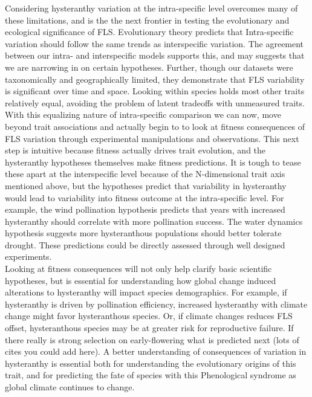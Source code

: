 \documentclass[12pt]{article}\usepackage[]{graphicx}\usepackage[]{color}
\begin{document}
\indent Considering hysteranthy variation at the intra-specific level overcomes many of these limitations, and is the the next frontier in testing the evolutionary and ecological significance of FLS. Evolutionary theory predicts that Intra-specific variation should follow the same trends as interspecific variation. The agreement between our intra- and interspecific models supports this, and may suggests that we are narrowing in on certain hypotheses. Further, though our datasets were taxonomically and geographically limited, they demonstrate that FLS variability is significant over time and space. Looking within species holds most other traits relatively equal, avoiding the problem of latent tradeoffs with unmeasured traits.\\
\indent With this equalizing nature of intra-specific comparison we can now, move beyond trait associations and actually begin to to look at fitness consequences of FLS variation through experimental manipulations and observations. This next step is intuitive because fitness actually drives trait evolution, and the hysteranthy hypotheses themselves make fitness predictions. It is tough to tease these apart at the interspecific level because of the N-dimensional trait axis mentioned above, but the hypotheses predict that variability in hysteranthy would lead to variability into fitness outcome at the intra-specific level. For example, the wind pollination hypothesis predicts that years with increased hysteranthy should correlate with more pollination success. The water dynamics hypothesis suggests more hysteranthous populations should better tolerate drought. These predictions could be directly assessed through well designed experiments.\\
\indent Looking at fitness consequences will not only help clarify basic scientific hypotheses, but is essential for understanding how global change induced alterations to hysteranthy will impact species demographics. For example, if hysteranthy is driven by pollination efficiency, increased hysteranthy with climate change might favor hysteranthous species. Or, if climate changes reduces FLS offset, hysteranthous species may be at greater risk for reproductive failure. If there really is strong selection on early-flowering what is predicted next (lots of cites you could add here). %
A better understanding of consequences of variation in hysteranthy is essential both for understanding the evolutionary origins of this trait, and for predicting the fate of species with this Phenological syndrome as global climate continues to change.
\end{document}
